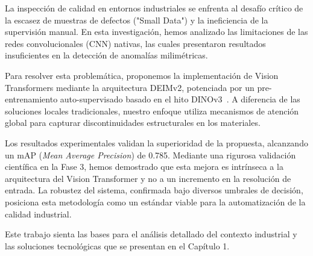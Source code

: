 \begin{resumen}

    La inspección de calidad en entornos industriales se enfrenta al desafío crítico de la escasez de muestras de defectos ("Small Data") y la ineficiencia de la supervisión manual. En esta investigación, hemos analizado las limitaciones de las redes convolucionales (CNN) nativas, las cuales presentaron resultados insuficientes en la detección de anomalías milimétricas. 
    
    Para resolver esta problemática, proponemos la implementación de Vision Transformers \cite{dosovitskiy2021vit} mediante la arquitectura DEIMv2, potenciada por un pre-entrenamiento auto-supervisado basado en el hito DINOv3~\cite{simeoni2025dinov3}. A diferencia de las soluciones locales tradicionales, nuestro enfoque utiliza mecanismos de atención global para capturar discontinuidades estructurales en los materiales.
    
    Los resultados experimentales validan la superioridad de la propuesta, alcanzando un mAP (\textit{Mean Average Precision}) de 0.785. Mediante una rigurosa validación científica en la Fase 3, hemos demostrado que esta mejora es intrínseca a la arquitectura del Vision Transformer y no a un incremento en la resolución de entrada. La robustez del sistema, confirmada bajo diversos umbrales de decisión, posiciona esta metodología como un estándar viable para la automatización de la calidad industrial.
    
    Este trabajo sienta las bases para el análisis detallado del contexto industrial y las soluciones tecnológicas que se presentan en el Capítulo 1.
    \end{resumen}
    
